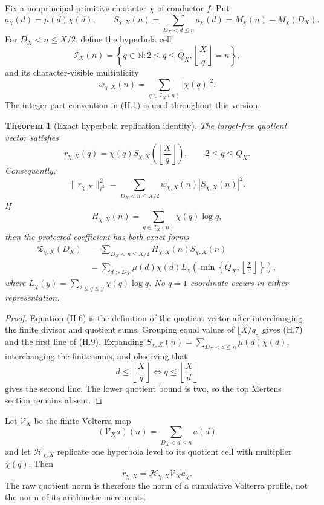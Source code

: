 \documentclass[11pt]{article}
\newtheorem{theorem}{Theorem}[section]
\theoremstyle{definition}
\theoremstyle{remark}
\begin{document}
Fix a nonprincipal primitive character \(\chi\) of conductor \(f\).  Put
\[
 a_\chi(d)=\mu(d)\chi(d),
 \qquad
 S_{\chi,X}(n)
 =\sum_{D_X<d\le n}a_\chi(d)
 =M_\chi(n)-M_\chi(D_X).
 \tag{H.3}
\]
For \(D_X<n\le X/2\), define the hyperbola cell
\[
 \mathcal I_X(n)
 =\left\{q\in\mathbb N:
   2\le q\le Q_X,
   \left\lfloor\frac Xq\right\rfloor=n
  \right\},
 \tag{H.4}
\]
and its character-visible multiplicity
\[
 w_{\chi,X}(n)
 =\sum_{q\in\mathcal I_X(n)}|\chi(q)|^2.
 \tag{H.5}
\]
The integer-part convention in \textup{(H.1)} is used throughout this
version.

\begin{theorem}[Exact hyperbola replication identity]
\label{thm:hyperbola-hyperbola-replication}
The target-free quotient vector satisfies
\[
 \boxed{
 r_{\chi,X}(q)
 =\chi(q)S_{\chi,X}\!\left(\left\lfloor\frac Xq\right\rfloor\right),
 \qquad 2\le q\le Q_X.}
 \tag{H.6}
\]
Consequently,
\[
 \boxed{
 \|r_{\chi,X}\|_{\ell^2}^2
 =\sum_{D_X<n\le X/2}
   w_{\chi,X}(n)|S_{\chi,X}(n)|^2.}
 \tag{H.7}
\]
If
\[
 H_{\chi,X}(n)
 =\sum_{q\in\mathcal I_X(n)}\chi(q)\log q,
 \tag{H.8}
\]
then the protected coefficient has both exact forms
\[
 \boxed{
 \begin{aligned}
 \mathfrak T_{\chi,X}(D_X)
 &=\sum_{D_X<n\le X/2}
   H_{\chi,X}(n)S_{\chi,X}(n)\\
 &=\sum_{d>D_X}\mu(d)\chi(d)
   L_\chi\!\left(
    \min\left\{Q_X,\left\lfloor\frac Xd\right\rfloor\right\}
   \right),
 \end{aligned}}
 \tag{H.9}
\]
where \(L_\chi(y)=\sum_{2\le q\le y}\chi(q)\log q\).  No \(q=1\)
coordinate occurs in either representation.
\end{theorem}

\begin{proof}
Equation \textup{(H.6)} is the definition of the quotient vector after
interchanging the finite divisor and quotient sums.  Grouping equal values of
\(\lfloor X/q\rfloor\) gives \textup{(H.7)} and the first line of
\textup{(H.9)}.  Expanding
\(S_{\chi,X}(n)=\sum_{D_X<d\le n}\mu(d)\chi(d)\), interchanging the finite
sums, and observing that
\[
 d\le\left\lfloor\frac Xq\right\rfloor
 \iff q\le\left\lfloor\frac Xd\right\rfloor
\]
gives the second line.  The lower quotient bound is two, so the top Mertens
section remains absent.
\end{proof}

Let \(\mathscr V_X\) be the finite Volterra map
\[
 (\mathscr V_Xa)(n)=\sum_{D_X<d\le n}a(d)
 \tag{H.10}
\]
and let \(\mathscr H_{\chi,X}\) replicate one hyperbola level to its quotient
cell with multiplier \(\chi(q)\).  Then
\[
 \boxed{
 r_{\chi,X}
 =\mathscr H_{\chi,X}\mathscr V_Xa_\chi.}
 \tag{H.11}
\]
The raw quotient norm is therefore the norm of a cumulative Volterra profile,
not the norm of its arithmetic increments.
\end{document}
